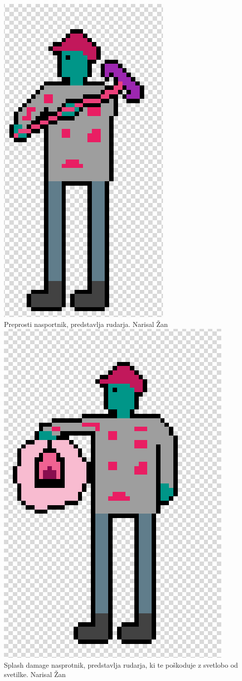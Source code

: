\documentclass[a4paper]{article}
\begin{document}
\includegraphics[scale=0.3]{Screenshot_1.png}
\\
Preprosti nasportnik, predstavlja rudarja. Narisal Žan
\\
\includegraphics[scale=0.3]{Screenshot_2.png}
\\
Splash damage nasprotnik, predstavlja rudarja, ki te poškoduje z svetlobo od svetilke. Narisal Žan
\end{document}
